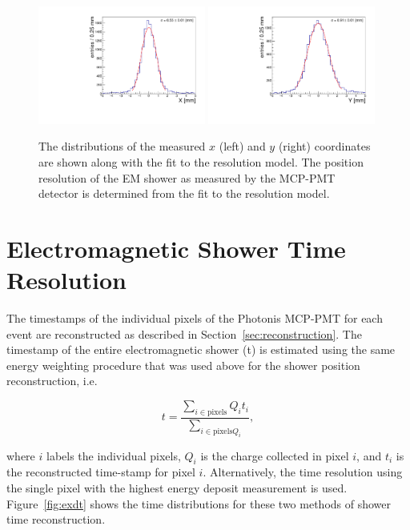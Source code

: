 \begin{figure}[h] \centering
\includegraphics[width=0.49\textwidth]{Images/XYResolution/X_Resolution_fixedTrigger.pdf}
\includegraphics[width=0.49\textwidth]{Images/XYResolution/Y_Resolution_fixedTrigger.pdf}
\caption{The distributions of the measured $x$ (left) and $y$ (right)
coordinates are shown along with the fit to the resolution model. The position
resolution of the EM shower as measured by the MCP-PMT detector is determined from
the fit to the resolution model. } \label{fig:ResolutionMeasurement}
\end{figure}

\section{Electromagnetic Shower Time Resolution} \label{sec:timing} 
The timestamps of the individual pixels of the Photonis MCP-PMT for each event are
reconstructed as described in Section~\ref{sec:reconstruction}. The
timestamp of the entire electromagnetic shower (t) is estimated using the same energy
weighting procedure that was used above for the shower position
reconstruction, i.e.

\begin{equation} t =\frac{\sum_{i\in\mathrm{pixels}} Q_{i} t_{i}}
{\sum_{i\in\mathrm{pixels} Q_{i}}}, 
\label{eqn:EnergyWeightedTimestamp}
\end{equation} 

where $i$ labels the individual pixels, $Q_{i}$ is the charge
collected in pixel $i$, and $t_{i}$ is the reconstructed time-stamp for pixel
$i$. Alternatively, the time resolution using the single pixel
with the highest energy deposit measurement is used. Figure~\ref{fig:exdt} shows
the time distributions for these two methods of shower time reconstruction.

